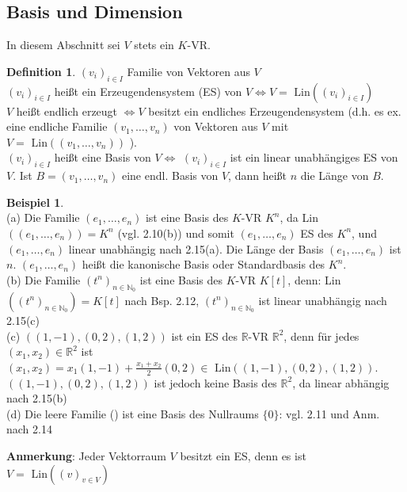 \documentclass[10pt,a4paper,numbers=endperiod]{scrartcl}
\theoremstyle{definition}
\newtheorem{defi}[satz]{Definition}
\newtheorem{bsp}[satz]{Beispiel}
\begin{document}
\subsection{Basis und Dimension}
In diesem Abschnitt sei $V$ stets ein $K$-VR.

\begin{defi}
	 $(v_i)_{i \in I}$ Familie von Vektoren aus $V$\\
	  $(v_i)_{i \in I}$ heißt ein Erzeugendensystem (ES) von $V \Leftrightarrow V= \text{ Lin}((v_i)_{i\in I})$\\
	  $V$ heißt endlich erzeugt $\Leftrightarrow V$ besitzt ein endliches Erzeugendensystem (d.h. es ex. eine endliche Familie $(v_1,\ldots,v_n)$ von Vektoren aus $V$ mit $V= \text{ Lin}((v_1, \ldots, v_n))$ ).\\
	   $(v_i)_{i \in I}$ heißt eine Basis von $V \Leftrightarrow$  $(v_i)_{i \in I}$ ist ein linear unabhängiges ES von $V$. Ist $B = (v_1, \ldots,v_n)$ eine endl. Basis von $V$, dann heißt $n$ die Länge von $B$. 
\end{defi}

\begin{bsp}
	$ $\\
	(a) Die Familie $(e_1,\ldots,e_n)$ ist eine Basis des $K$-VR $K^n$, da Lin$((e_1,\ldots,e_n))=K^n$ (vgl. 2.10(b)) und somit $(e_1,\ldots,e_n)$ ES des $K^n$, und $(e_1,\ldots,e_n)$ linear unabhängig nach 2.15(a). Die Länge der Basis $(e_1,\ldots,e_n)$ ist $n$. $(e_1,\ldots,e_n)$ heißt die kanonische Basis oder Standardbasis des $K^n$.\\
	(b) Die Familie $(t^n)_{n\in \mathbb{N}_0}$ ist eine Basis des $K$-VR $K[t]$, denn: Lin$((t^n)_{n\in \mathbb{N}_0}) = K[t]$ nach Bsp. 2.12, $(t^n)_{n \in \mathbb{N}_0}$ ist linear unabhängig nach 2.15(c)\\
	(c) $((1,-1),(0,2),(1,2))$ ist ein ES des $\mathbb{R}$-VR $\mathbb{R}^{2}$, denn für jedes $(x_1,x_2) \in \mathbb{R}^2$ ist $(x_1,x_2) = x_1(1,-1) + \frac{x_1+x_2}{2}(0,2) \in \text{ Lin}((1,-1),(0,2),(1,2))$. $((1,-1),(0,2),(1,2))$ ist jedoch keine Basis des $\mathbb{R}^2$, da linear abhängig nach 2.15(b)\\
	(d) Die leere Familie () ist eine Basis des Nullraums $\{0\}$: vgl. 2.11 und Anm. nach 2.14
\end{bsp}

\textbf{Anmerkung}: Jeder Vektorraum $V$ besitzt ein ES, denn es ist $V = \text{ Lin}((v)_{v\in V})$
\end{document}
